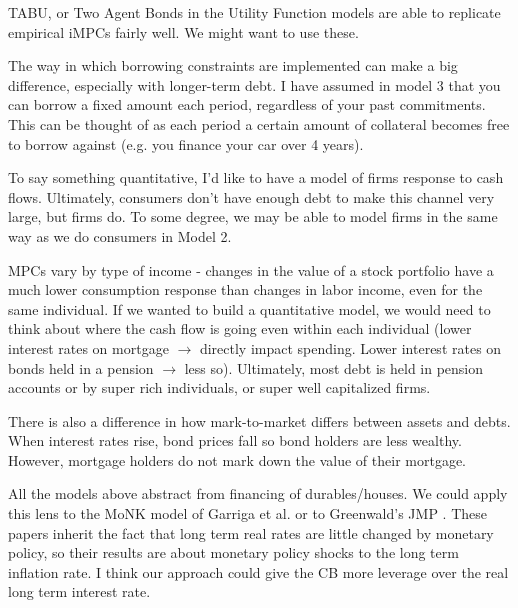 \documentclass[AER]{AEA}
\begin{document}
TABU, or Two Agent Bonds in the Utility Function models are able to replicate empirical iMPCs fairly well. We might want to use these.

The way in which borrowing constraints are implemented can make a big difference, especially with longer-term debt. I have assumed in model 3 that you can borrow a fixed amount each period, regardless of your past commitments. This can be thought of as each period a certain amount of collateral becomes free to borrow against (e.g. you finance your car over 4 years).

To say something quantitative, I'd like to have a model of firms response to cash flows. Ultimately, consumers don't have enough debt to make this channel very large, but firms do. To some degree, we may be able to model firms in the same way as we do consumers in Model 2.

MPCs vary by type of income - changes in the value of a stock portfolio have a much lower consumption response than changes in labor income, even for the same individual. If we wanted to build a quantitative model, we would need to think about where the cash flow is going even within each individual (lower interest rates on mortgage $\rightarrow$ directly impact spending. Lower interest rates on bonds held in a pension $\rightarrow$ less so). Ultimately, most debt is held in pension accounts or by super rich individuals, or super well capitalized firms. 

There is also a difference in how mark-to-market differs between assets and debts. When interest rates rise, bond prices fall so bond holders are less wealthy. However, mortgage holders do not mark down the value of their mortgage.

All the models above abstract from financing of durables/houses.  We could apply this lens to the MoNK model of Garriga et al. \cite{garriga_monk_2019} or to Greenwald's JMP \cite{greenwald_mortgage_2018}. These papers inherit the fact that long term real rates are little changed by monetary policy, so their results are about monetary policy shocks to the long term inflation rate. I think our approach could give the CB more leverage over the real long term interest rate.






\appendix
\end{document}

